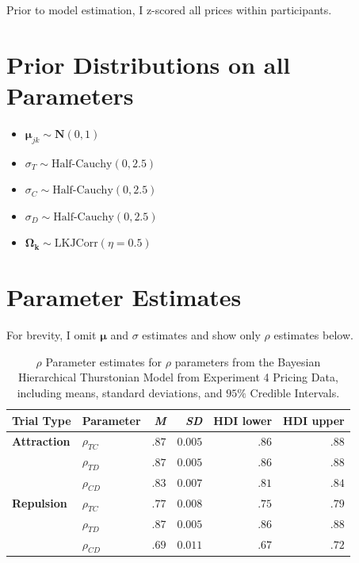 Prior to model estimation, I z-scored all prices within participants. 

\section{Prior Distributions on all Parameters}

\begin{itemize}
    \item $\boldsymbol{\mu}_{jk} \sim \mathcal{\textbf{N}}(0,1)$
    \item $\sigma_{T} \sim \text{Half-Cauchy}(0,2.5)$
    \item $\sigma_{C} \sim \text{Half-Cauchy}(0,2.5)$
    \item $\sigma_{D} \sim \text{Half-Cauchy}(0,2.5)$
    \item $\boldsymbol{\Omega_{k}} \sim \text{LKJCorr}(\eta=0.5)$
\end{itemize}

\section{Parameter Estimates}

For brevity, I omit $\boldsymbol{\mu}$ and $\sigma$ estimates and show only $\rho$ estimates below.
\begin{table}[ht]
    \centering
    \begin{tabular}{llrrrr}
        \toprule
        Trial Type & Parameter & \textit{M} & \textit{SD} & HDI lower & HDI upper \\
        \midrule
        \textbf{Attraction}  &  $\rho_{TC}$     &    $.87$   &   $0.005$    &  $.86$     & $.88$     \\
                             &  $\rho_{TD}$    &     $.87$   &   $0.005$    &  $.86$     & $.88$     \\
                             &  $\rho_{CD}$    &     $.83$   &   $0.007$    &  $.81$     & $.84$     \\
        \textbf{Repulsion}   &  $\rho_{TC}$     &    $.77$   &   $0.008$    &  $.75$     & $.79$     \\
                             &  $\rho_{TD}$    &     $.87$   &   $0.005$    &  $.86$     & $.88$     \\
                             &  $\rho_{CD}$    &     $.69$   &   $0.011$     &  $.67$     & $.72$     \\
        \bottomrule
    \end{tabular}
    \caption{$\rho$ Parameter estimates for $\rho$ parameters from the Bayesian Hierarchical Thurstonian Model from Experiment 4 Pricing Data, including means, standard deviations, and $95\%$ Credible Intervals.}
    \label{tab:e4_rho_params}
\end{table}

